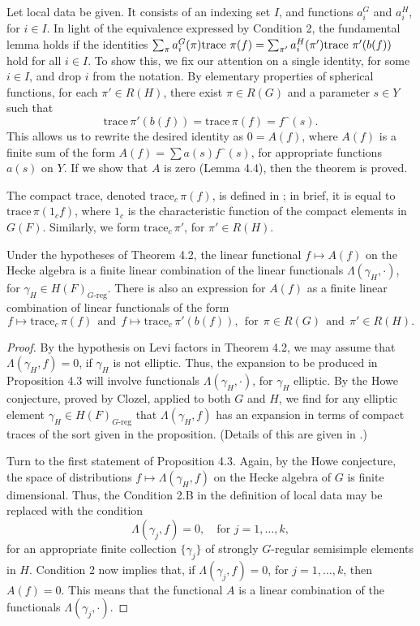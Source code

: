 \documentclass{amsart}
\newenvironment{cthm}[1]
  {\renewcommand\thethm{\sc #1}\thm}
  {\endthm}
\newcommand\tr{\text{trace\,}}
\begin{document}
Let local data be given.  It consists of an indexing
set $I$, and functions $a_i^G$ and $a_i^H$, for $i\in I$.  In
light of the equivalence expressed by Condition 2, the fundamental
lemma holds if the identities
$\sum_\pi a^G_i(\pi)\tr\,\pi(f) =
   \sum_{\pi'} a_i^H(\pi')\tr\,\pi'(b(f))$
hold for all $i\in I$.  
To show this, we fix our attention
on a single identity, for some $i\in I$, and drop $i$ from the notation.
By elementary
properties of spherical functions, for each $\pi'\in R(H)$, 
there exist
 $\pi\in R(G)$ and a parameter $s\in Y$ such that
$$ \text{trace}\,\pi'(b(f)) = \text{trace}\,\pi(f)= f\hat{\phantom{o}}(s).$$
This allows us to rewrite the desired identity as 
$0=A(f)$, where $A(f)$ is a finite sum of the
form $A(f) = \sum a(s) f\hat{\phantom{o}}(s)$, for
appropriate functions $a(s)$ on $Y$.  If we show that $A$ is
zero (Lemma 4.4), then the theorem is proved.

The compact trace, denoted $\text{trace}_c\,\pi(f)$, is defined
in \cite{Cl1}; in brief, it is equal to $\text{trace}\,\pi(1_cf)$, where
$1_c$ is the characteristic function of the compact elements in $G(F)$.
Similarly, we form $\text{trace}_c\,\pi'$, for
$\pi'\in R(H)$.  


\begin{cthm}{Proposition 4.3}  
Under the hypotheses of Theorem 4.2, the linear functional
$f\mapsto A(f)$ on the Hecke algebra is a finite linear combination of
the linear functionals $\Lambda(\gamma_H,\cdot)$, for 
$\gamma_H\in H(F)_{G\text{-reg}}$.
There is also an expression for $A(f)$
as a finite linear combination of linear functionals of the form
$$f\mapsto \text{trace}_c\,\pi(f)\ \ \text{and}\ \ 
  f\mapsto \text{trace}_c\,\pi'(b(f)),\ \ \text{for} \ \
  \pi\in R(G)\ \ \text{and}\ \ \pi'\in R(H).$$
\end{cthm}

\begin{proof}  
By the hypothesis on Levi factors in Theorem 4.2, we
may assume that $\Lambda(\gamma_H,f)=0$, if $\gamma_H$ is not
elliptic.  Thus, the expansion to be produced in Proposition 4.3 will
involve functionals $\Lambda(\gamma_H,\cdot)$, for $\gamma_H$ elliptic.
By the Howe conjecture, proved by Clozel, applied to
both $G$ and $H$, we find for any elliptic
element $\gamma_H\in H(F)_{G\text{-reg}}$ that $\Lambda(\gamma_H,f)$ has an
expansion in terms of compact traces of the sort given
in the proposition.  (Details of this are given in \cite{H1,1}.)  

Turn to the first statement of Proposition 4.3.  Again, 
by the Howe conjecture, the space
of distributions $f\mapsto \Lambda(\gamma_H,f)$ on the Hecke
algebra of $G$ is finite dimensional.  Thus, the Condition 2.B
in the definition of local data may be replaced with the
condition
\begin{equation}\tag{$B'$}
\Lambda(\gamma_j,f) = 0,\quad \text{for } j=1,\dots,k,
\end{equation}
for an appropriate finite collection $\{\gamma_j\}$ of strongly $G$-regular
semisimple elements in $H$.  Condition 2 now implies that, if $\Lambda(\gamma_j,f)=0$,
for $j=1,\ldots,k$, then $A(f)=0$.  This means that the functional
$A$ is a linear combination of the functionals $\Lambda(\gamma_j,\cdot)$.
\end{proof}
\end{document}
